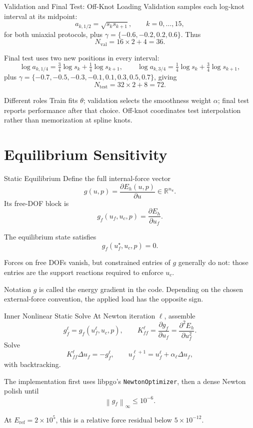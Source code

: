 \documentclass[aspectratio=169,10pt]{beamer}
\newcommand{\norm}[1]{\left\lVert #1\right\rVert}
\newcommand{\eref}{E_{\mathrm{ref}}}
\newcommand{\Kff}{K_{\!ff}}
\begin{document}
\begin{frame}{Validation and Final Test: Off-Knot Loading}
  \small
  Validation samples each log-knot interval at its midpoint:
  \[
    a_{k,1/2}=\sqrt{s_ks_{k+1}},
    \qquad k=0,\ldots,15,
  \]
  for both uniaxial protocols, plus
  $\gamma=\{-0.6,-0.2,0.2,0.6\}$. Thus
  \[
    N_{\mathrm{val}}=16\times2+4=36.
  \]

  Final test uses two new positions in every interval:
  \[
    \log a_{k,1/4}
    =\tfrac34\log s_k+\tfrac14\log s_{k+1},
    \qquad
    \log a_{k,3/4}
    =\tfrac14\log s_k+\tfrac34\log s_{k+1},
  \]
  plus
  $\gamma=\{-0.7,-0.5,-0.3,-0.1,0.1,0.3,0.5,0.7\}$, giving
  \[
    N_{\mathrm{test}}=32\times2+8=72.
  \]

  \begin{block}{Different roles}
    Train fits $\theta$; validation selects the smoothness weight $\alpha$;
    final test reports performance after that choice. Off-knot coordinates
    test interpolation rather than memorization at spline knots.
  \end{block}
\end{frame}

\section{Equilibrium Sensitivity}

\begin{frame}{Static Equilibrium}
  \small
  Define the full internal-force vector
  \[
    g(u,p)=\frac{\partial E_h(u,p)}{\partial u}
    \in\mathbb R^{n_u}.
  \]
  Its free-DOF block is
  \[
    g_f(u_f,u_c,p)
    =
    \frac{\partial E_h}{\partial u_f}.
  \]

  The equilibrium state satisfies
  \[
    \boxed{
      g_f(u_f^\star,u_c,p)=0
    }.
  \]

  Forces on free DOFs vanish, but constrained entries of $g$ generally do
  not: those entries are the support reactions required to enforce $u_c$.

  \begin{alertblock}{Notation}
    $g$ is called the energy gradient in the code. Depending on the chosen
    external-force convention, the applied load has the opposite sign.
  \end{alertblock}
\end{frame}

\begin{frame}{Inner Nonlinear Static Solve}
  \small
  At Newton iteration $\ell$, assemble
  \[
    g_f^\ell
    =
    g_f(u_f^\ell,u_c,p),
    \qquad
    \Kff^\ell
    =
    \frac{\partial g_f}{\partial u_f}
    =
    \frac{\partial^2E_h}{\partial u_f^2}.
  \]
  Solve
  \[
    \Kff^\ell\Delta u_f=-g_f^\ell,
    \qquad
    u_f^{\ell+1}=u_f^\ell+\alpha_\ell\Delta u_f,
  \]
  with backtracking.

  The implementation first uses libpgo's \texttt{NewtonOptimizer}, then a
  dense Newton polish until
  \[
    \norm{g_f}_\infty\le 10^{-6}.
  \]

  At $\eref=2\times10^5$, this is a relative force residual below
  $5\times10^{-12}$.
\end{frame}
\end{document}
